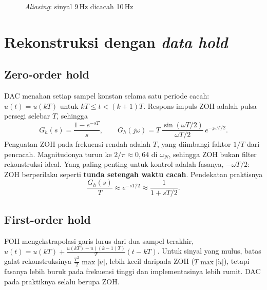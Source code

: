\begin{figure}[H]
	\centering
	\caption{\textit{Aliasing}: sinyal 9\,Hz dicacah 10\,Hz}
	\label{fig:b2-alias}
\end{figure}

\section{Rekonstruksi dengan \textit{data hold}}
\subsection{Zero-order hold}
DAC menahan setiap sampel konstan selama satu periode cacah: $u(t) = u(kT)$ untuk $kT \le t < (k+1)T$. Respons impuls ZOH adalah pulsa persegi selebar $T$, sehingga
\begin{equation}
	G_h(s) = \frac{1-e^{-sT}}{s},\qquad G_h(j\omega) = T\,\frac{\sin(\omega T/2)}{\omega T/2}\,e^{-j\omega T/2}.
\end{equation}
Penguatan ZOH pada frekuensi rendah adalah $T$, yang diimbangi faktor $1/T$ dari pencacah. Magnitudonya turun ke $2/\pi \approx 0{,}64$ di $\omega_N$, sehingga ZOH bukan filter rekonstruksi ideal. Yang paling penting untuk kontrol adalah fasanya, $-\omega T/2$: ZOH berperilaku seperti \textbf{tunda setengah waktu cacah}. Pendekatan praktisnya
\begin{equation}
	\frac{G_h(s)}{T} \approx e^{-sT/2} \approx \frac{1}{1+sT/2}.
\end{equation}

\subsection{First-order hold}
FOH mengekstrapolasi garis lurus dari dua sampel terakhir, $u(t) = u(kT) + \frac{u(kT)-u((k-1)T)}{T}(t-kT)$. Untuk sinyal yang mulus, batas galat rekonstruksinya $\frac{T^2}{2}\max|\ddot u|$, lebih kecil daripada ZOH ($T\max|\dot u|$), tetapi fasanya lebih buruk pada frekuensi tinggi dan implementasinya lebih rumit. DAC pada praktiknya selalu berupa ZOH.


